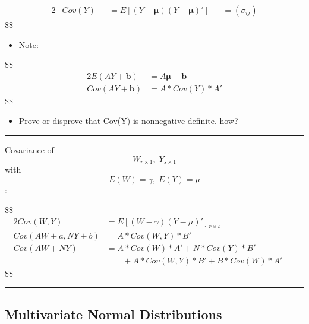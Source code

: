 \documentclass[
]{book}
\providecommand{\tightlist}{%
  \setlength{\itemsep}{0pt}\setlength{\parskip}{0pt}}
\begin{document}
{{{\begin{alignat}{2}
&Cov(Y) &&= E \left[ (Y-\pmb \mu) (Y-\pmb \mu) ' \right] &&= (\sigma_{ij}) \tag{Covariance Matrix}

\end{alignat}
\$\$

\begin{itemize}
\tightlist
\item
  Note:
\end{itemize}

\$\$
\begin{alignat}{2}


E(AY+\pmb b) &= A \pmb \mu + \pmb b

\\

Cov(AY+\pmb b) &= A \ast Cov(Y) \ast A '

\end{alignat}
\$\$

\begin{itemize}
\tightlist
\item
  Prove or disprove that Cov(Y) is nonnegative definite. how?
\end{itemize}

\begin{center}\rule{0.5\linewidth}{0.5pt}\end{center}

Covariance of \[W_{r \times 1}, \; Y_{s \times 1}\] with \[E(W)=\gamma, \; E(Y) = \mu\]:

\$\$
\begin{alignat}{2}

Cov(W, Y) &= E \left [(W-\gamma)(Y-\mu)' \right ]_{r \times s} &&

\\

Cov(AW+a, NY+b) &= A \ast Cov(W,Y) \ast B ' &&

\\

Cov(AW+NY) &= A \ast Cov(W) \ast A' + N \ast Cov(Y) \ast B' \\
&\; \; \; \; \; \; \; + A \ast Cov(W,Y) \ast B' + B \ast Cov(W) \ast A' \tag{why?}

\end{alignat}
\$\$

\begin{center}\rule{0.5\linewidth}{0.5pt}\end{center}

\hypertarget{multivariate-normal-distributions}{%
\subsection{Multivariate Normal Distributions}\label{multivariate-normal-distributions}}

}}}
\end{document}
